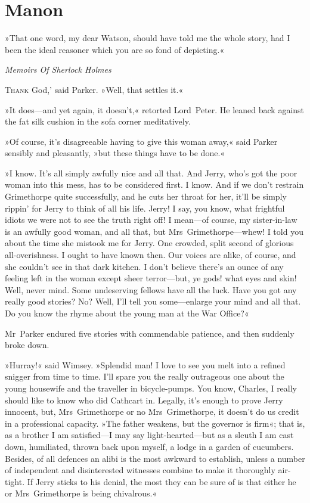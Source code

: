
\chapter{Manon}
\epigraph{»That one word, my dear Watson, should have told me the whole story, had I been the ideal reasoner which you are so fond of depicting.«}{\textit{Memoirs Of Sherlock Holmes}}

\lettrine[lines=4,ante=`]{T}{hank} God,' said Parker. »Well, that settles it.«

\zz
»It does—and yet again, it doesn't,« retorted Lord~Peter. He leaned back against the fat silk cushion in the sofa corner meditatively.

»Of course, it's disagreeable having to give this woman away,« said Parker sensibly and pleasantly, »but these things have to be done.«

»I know. It's all simply awfully nice and all that. And Jerry, who's got the poor woman into this mess, has to be considered first. I know. And if we don't restrain Grimethorpe quite successfully, and he cuts her throat for her, it'll be simply rippin' for Jerry to think of all his life\textellipsis . Jerry! I say, you know, what frightful idiots we were not to see the truth right off! I mean—of course, my sister-in-law is an awfully good woman, and all that, but Mrs~Grimethorpe—whew! I told you about the time she mistook me for Jerry. One crowded, split second of glorious all-overishness. I ought to have known then. Our voices are alike, of course, and she couldn't see in that dark kitchen. I don't believe there's an ounce of any feeling left in the woman except sheer terror—but, ye gods! what eyes and skin! Well, never mind. Some undeserving fellows have all the luck. Have you got any really good stories? No? Well, I'll tell you some—enlarge your mind and all that. Do you know the rhyme about the young man at the War Office?«

Mr~Parker endured five stories with commendable patience, and then suddenly broke down.

»Hurray!« said Wimsey. »Splendid man! I love to see you melt into a refined snigger from time to time. I'll spare you the really outrageous one about the young housewife and the traveller in bicycle-pumps. You know, Charles, I really should like to know who did Cathcart in. Legally, it's enough to prove Jerry innocent, but, Mrs~Grimethorpe or no Mrs~Grimethorpe, it doesn't do us credit in a professional capacity. »The father weakens, but the governor is firm«; that is, as a brother I am satisfied—I may say light-hearted—but as a sleuth I am cast down, humiliated, thrown back upon myself, a lodge in a garden of cucumbers. Besides, of all defences an alibi is the most awkward to establish, unless a number of independent and disinterested witnesses combine to make it thoroughly air-tight. If Jerry sticks to his denial, the most they can be sure of is that either he or Mrs~Grimethorpe is being chivalrous.«

